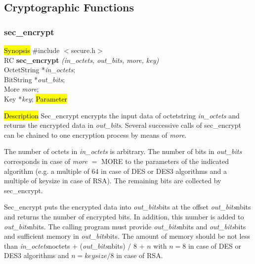 \subsection{Cryptographic Functions}
\subsubsection{sec\_encrypt}
\label{sec_encrypt}
\hl{Synopsis}
\#include $<$secure.h$>$ \\ [0.5cm]
RC {\bf sec\_encrypt} {\em (in\_octets, out\_bits, more, key)} \\
OctetString *{\em in\_octets}; \\
BitString *{\em out\_bits}; \\
More {\em more}; \\
Key *{\em key};
\hl{Parameter}




\hl{Description}
Sec\_encrypt encrypts the input data of octetstring {\em in\_octets} and returns the encrypted data
in {\em out\_bits}. Several successive calls of sec\_encrypt can be chained
to one encryption process by means of {\em more}.
          
The number of octets in {\em in\_octets} is arbitrary. The number of bits in {\em out\_bits}
corresponds in case of {\em more} $=$ MORE to the parameters of the indicated algorithm
(e.g. a multiple of 64 in case of DES or DES3 algorithms and a multiple of keysize
in case of RSA). The remaining bits are collected by sec\_encrypt.

Sec\_encrypt puts the encrypted data into {\em out\_bits}\pf bits at the offset
{\em out\_bits}\pf nbits and returns the number of encrypted bits. In addition, this number is added 
to {\em out\_bits}\pf nbits.
The calling program must provide {\em out\_bits}\pf nbits and {\em out\_bits}\pf bits and sufficient
memory in {\em out\_bits}\pf bits. 
The amount of memory should be not less than
{\em in\_octets}\pf noctets $+$ ({\em out\_bits}\pf nbits) $/$ 8 $+$ $n$ with $n = 8$ 
in case of DES or DES3 algorithms and $n = keysize / 8$ in case of RSA.

